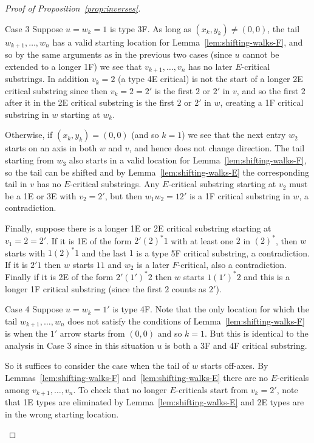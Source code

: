 \documentclass[10pt]{amsart}
\theoremstyle{definition}
\begin{document}
\begin{proof}[Proof of Proposition~\ref{prop:inverses}]
\begin{enonce*}[remark]{Case 3} Suppose $u=w_k=1$ is type 3F. As long as $(x_k,y_k)\neq (0,0)$, the tail $w_{k+1},\ldots, w_{n}$ has a valid starting location for Lemma~\ref{lem:shifting-walks-F}, and so by the same arguments as in the previous two cases (since $u$ cannot be extended to a longer 1F) we see that $v_{k+1},\ldots,v_n$ has no later $E$-critical substrings. In addition $v_k=2$ (a type 4E critical) is not the start of a longer 2E critical substring since then $v_k=2=2'$ is the first $2$ or $2'$ in $v$, and so the first $2$ after it in the 2E critical substring is the first $2$ or $2'$ in $w$, creating a 1F critical substring in $w$ starting at $w_k$.

Otherwise, if $(x_k,y_k)=(0,0)$ (and so $k=1$) we see that the next entry $w_2$ starts on an axis in both $w$ and $v$, and hence does not change direction. The tail starting from $w_3$ also starts in a valid location for Lemma~\ref{lem:shifting-walks-F}, so the tail can be shifted and by Lemma~\ref{lem:shifting-walks-E} the corresponding tail in $v$ has no $E$-critical substrings. Any $E$-critical substring starting at $v_2$ must be a 1E or 3E with $v_2=2'$, but then $w_1w_2=12'$ is a 1F critical substring in $w$, a contradiction. 

Finally, suppose there is a longer 1E or 2E critical substring starting at $v_1=2=2'$. If it is 1E of the form $2'(2)^\ast 1$ with at least one $2$ in $(2)^\ast$, then $w$ starts with $1(2)^\ast 1$ and the last $1$ is a type 5F critical substring, a contradiction. If it is $2'1$ then $w$ starts $11$ and $w_2$ is a later $F$-critical, also a contradiction. Finally if it is 2E of the form $2'(1')^\ast 2$ then $w$ starts $1(1')^\ast 2$ and this is a longer 1F critical substring (since the first $2$ counts as $2'$).
\end{enonce*}

\begin{enonce*}[remark]{Case 4} Suppose $u=w_k=1'$ is type 4F. Note that the only location for which the tail $w_{k+1},\ldots,w_{n}$ does not satisfy the conditions of Lemma~\ref{lem:shifting-walks-F} is when the $1'$ arrow starts from $(0,0)$ and so $k=1$. But this is identical to the analysis in Case 3 since in this situation $u$ is both a 3F and 4F critical substring.

So it suffices to consider the case when the tail of $w$ starts off-axes. By Lemmas~\ref{lem:shifting-walks-F} and~\ref{lem:shifting-walks-E} there are no $E$-criticals among $v_{k+1},\ldots,v_n$. To check that no longer $E$-criticals start from $v_k=2'$, note that 1E types are eliminated by Lemma~\ref{lem:shifting-walks-E} and 2E types are in the wrong starting location.\qedhere
\end{enonce*}
\end{proof}
\end{document}
